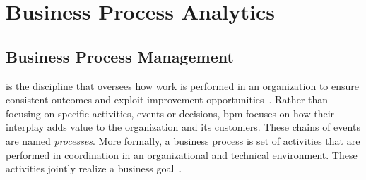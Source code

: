 





\section{Business Process Analytics}


\subsection{Business Process Management}
\label{sec:business-process}

 is the discipline that oversees how work is performed in an organization to ensure consistent outcomes and exploit improvement opportunities~\citep{Dumas2018}. Rather than focusing on specific activities, events or decisions, \gls{bpm} focuses on how their interplay adds value to the organization and its customers. These chains of events are named \emph{processes}. More formally, a business process is set of activities that are performed in coordination in an organizational and technical
environment. These activities jointly realize a business goal~\citep{DBLP:books/sp/Weske19}.

